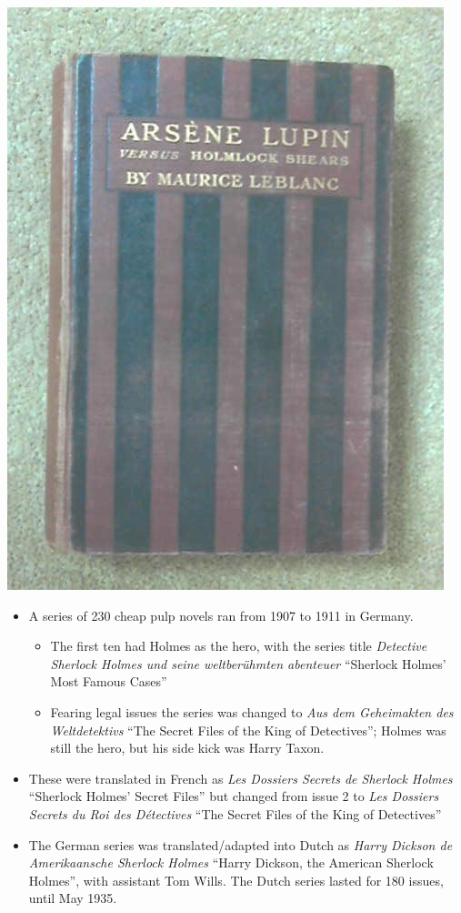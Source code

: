 \documentclass[a4paper,landscape,headrule,footrule,xetex]{foils}
\begin{document}
\includegraphics[height=0.7\textheight]{pics/lupi.jpg}



\begin{itemize}
\item A series of 230 cheap pulp novels ran from 1907 to 1911 in Germany.
  \begin{itemize}
  \item The first ten had Holmes as the hero, with the series title
    \textit{Detective Sherlock Holmes und seine weltberühmten
      abenteuer} ``Sherlock Holmes' Most Famous Cases''
  \item Fearing legal issues the series was changed to \textit{Aus dem
      Geheimakten des Weltdetektivs} ``The Secret Files of the King
      of Detectives''; Holmes was still the hero, but his side kick
      was Harry Taxon.
    \end{itemize}
  \item These were translated in French as \textit{Les Dossiers
      Secrets de Sherlock Holmes} ``Sherlock Holmes' Secret Files''
    but changed from issue 2 to \textit{Les Dossiers Secrets du Roi
      des Détectives} ``The Secret Files of the King of Detectives''
  \item The German series was translated/adapted into Dutch as
    \textit{Harry Dickson de Amerikaansche Sherlock Holmes} ``Harry
    Dickson, the American Sherlock Holmes'', with assistant Tom Wills.
    The Dutch series lasted for 180 issues, until May 1935.
    
  \end{itemize}
\end{document}
